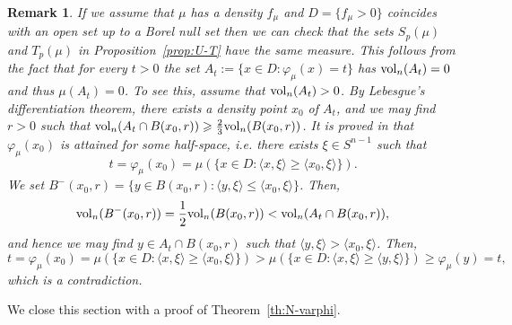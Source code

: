 \documentclass[11pt,leqno]{article}
\newtheorem{remark}[theorem]{Remark}
\theoremstyle{definition}
\theoremstyle{remark}
\numberwithin{equation}{section}
\newcommand{\vol}{{\rm vol}}
\newcommand{\ls}{\leqslant}
\newcommand{\gr}{\geqslant}
\newcommand{\1}{\textbf{1}}
\begin{document}
\begin{remark}\label{rem:equality}\rm  If we assume that $\mu$ has a density $f_{\mu}$ and $D=\{f_{\mu}>0\}$ coincides with an open set up to a Borel null set then we can check that the sets $S_p(\mu)$ and $T_p(\mu)$ in Proposition~\ref{prop:U-T} have the same measure.
This follows from the fact that for every $t>0$ the set $A_t:=\{x\in D:\varphi_{\mu}(x)=t\}$ has  $\vol_n(A_t)=0$ and thus $\mu(A_t)=0$. To see this, assume that
$\vol_n(A_t)>0$. By Lebesgue's differentiation theorem, there exists a density point $x_0$ of $A_t$, and we
may find $r>0$ such that $\vol_n(A_t\cap B(x_0,r))\gr\frac{2}{3}\vol_n(B(x_0,r))$.
It is proved in \cite{Laketa-Nagy-2022} that $\varphi_{\mu}(x_0)$ is attained for some half-space, i.e.
there exists $\xi\in S^{n-1}$ such that
$$t=\varphi_{\mu}(x_0)=\mu(\{x\in D:\langle x,\xi\rangle \gr \langle x_0,\xi\rangle \}).$$
We set $B^-(x_0,r)=\{y\in B(x_0,r):\langle y,\xi\rangle \ls \langle x_0,\xi\rangle \}$. Then,
$$\vol_n(B^-(x_0,r))=\frac{1}{2}\vol_n(B(x_0,r))<\vol_n(A_t\cap B(x_0,r)),$$
and hence we may find $y\in A_t\cap B(x_0,r)$ such that $\langle y,\xi\rangle >\langle x_0,\xi\rangle $.
Then,
$$t=\varphi_{\mu}(x_0)=\mu(\{x\in D:\langle x,\xi\rangle \gr \langle x_0,\xi\rangle \})
>\mu(\{x\in D:\langle x,\xi\rangle \gr \langle y,\xi\rangle \}) \gr \varphi_{\mu} (y)=t,$$
which is a contradiction.
\end{remark}

We close this section with a proof of Theorem~\ref{th:N-varphi}.
\end{document}
